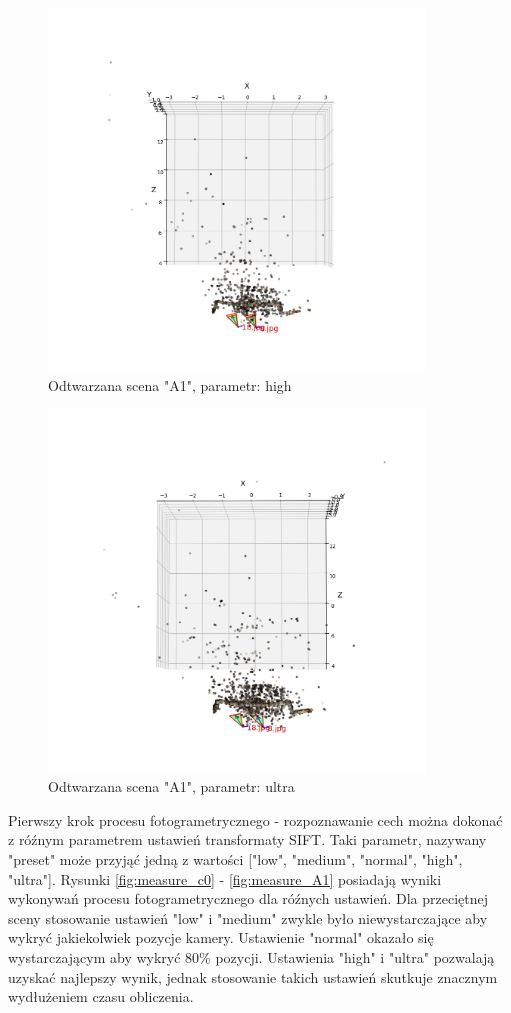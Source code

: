 \begin{figure}[h]
   \centering
   \includegraphics[width=10cm]{preset_A1/high.png}
   \caption{Odtwarzana scena "A1", parametr: high}
   \label {fig:preset_A1_high}
\end{figure}
\begin{figure}[h]
   \centering
   \includegraphics[width=10cm]{preset_A1/ultra.png}
   \caption{Odtwarzana scena "A1", parametr: ultra}
   \label {fig:preset_A1_ultra}
\end{figure}

Pierwszy krok procesu fotogrametrycznego - rozpoznawanie cech można dokonać z róźnym parametrem ustawień transformaty SIFT.
Taki parametr, nazywany "preset" może przyjąć jedną z wartości ["low", "medium", "normal", "high", "ultra"].
Rysunki \ref{fig:measure_c0} - \ref{fig:measure_A1} posiadają wyniki wykonywań procesu fotogrametrycznego dla róźnych ustawień.
Dla przeciętnej sceny stosowanie ustawień "low" i "medium" zwykle było niewystarczające aby wykryć jakiekolwiek pozycje kamery.
Ustawienie "normal" okazało się wystarczającym aby wykryć 80\% pozycji. Ustawienia "high" i "ultra" pozwalają uzyskać najlepszy wynik, jednak stosowanie takich ustawień skutkuje znacznym wydłużeniem czasu obliczenia.

